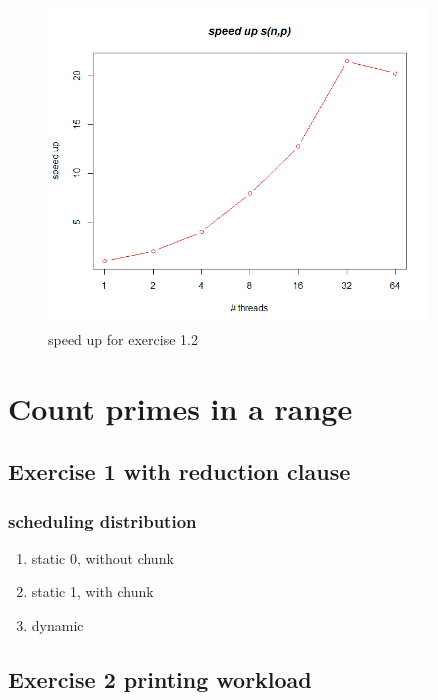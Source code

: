 \documentclass{article}
\begin{document}
\begin{figure}[ht]
	\centering
  \includegraphics[width=0.9\textwidth]{statistics/Ex12SpeedUpGraph.png}
	\caption{speed up for exercise 1.2}
\end{figure}

\section{Count primes in a range}

\subsection{Exercise 1 with reduction clause}

\subsubsection{scheduling distribution}

\begin{enumerate}
\item static 0, without chunk
\item static 1, with chunk
\item dynamic
\end{enumerate}

\subsection{Exercise 2 printing workload}






\end{document}
